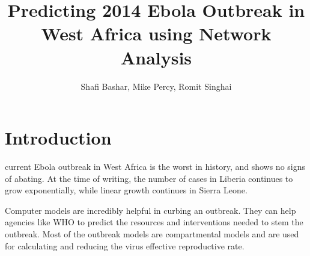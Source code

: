 \documentclass[12pt, journal,onecolumn]{IEEEtran}
\title{Predicting 2014 Ebola Outbreak in West Africa using Network Analysis}
\author{Shafi Bashar, Mike Percy, Romit  Singhai}
\affil{\textit {\{shafiab, mp81, romit\}@stanford.edu}}
\begin{document}
\maketitle

%



\section{Introduction}
\label{sec:introduction}

\bigskip
{} current Ebola outbreak in West Africa is the worst in history, and shows no signs
of abating. At the time of writing, the number of cases in Liberia continues to grow exponentially,
while linear growth continues in Sierra Leone.



Computer models are incredibly helpful in curbing an outbreak. They can help agencies like WHO to predict the resources and interventions needed
to stem the outbreak. Most of the outbreak models  are compartmental models and are used  for calculating and reducing the virus effective reproductive rate.
\end{document}
